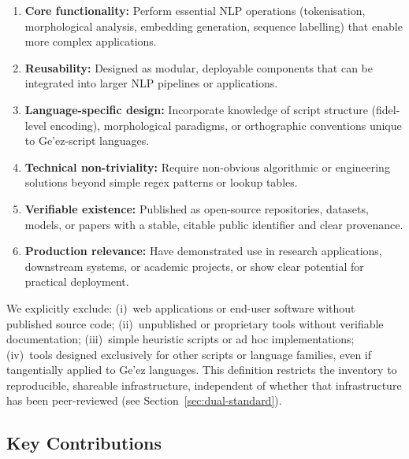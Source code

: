 \documentclass[sn-mathphys-num]{sn-jnl}
\theoremstyle{thmstyleone}
\theoremstyle{thmstyletwo}
\theoremstyle{thmstylethree}
\begin{document}
\begin{enumerate}
    \item \textbf{Core functionality:} Perform essential NLP operations (tokenisation, morphological analysis, embedding generation, sequence labelling) that enable more complex applications.
    \item \textbf{Reusability:} Designed as modular, deployable components that can be integrated into larger NLP pipelines or applications.
    \item \textbf{Language-specific design:} Incorporate knowledge of script structure (fidel-level encoding), morphological paradigms, or orthographic conventions unique to Ge'ez-script languages.
    \item \textbf{Technical non-triviality:} Require non-obvious algorithmic or engineering solutions beyond simple regex patterns or lookup tables.
    \item \textbf{Verifiable existence:} Published as open-source repositories, datasets, models, or papers with a stable, citable public identifier and clear provenance.
    \item \textbf{Production relevance:} Have demonstrated use in research applications, downstream systems, or academic projects, or show clear potential for practical deployment.
\end{enumerate}

We explicitly exclude: (i)~web applications or end-user software without published source code; (ii)~unpublished or proprietary tools without verifiable documentation; (iii)~simple heuristic scripts or ad hoc implementations; (iv)~tools designed exclusively for other scripts or language families, even if tangentially applied to Ge'ez languages. This definition restricts the inventory to reproducible, shareable infrastructure, independent of whether that infrastructure has been peer-reviewed (see Section~\ref{sec:dual-standard}).

\subsection{Key Contributions}
\end{document}
